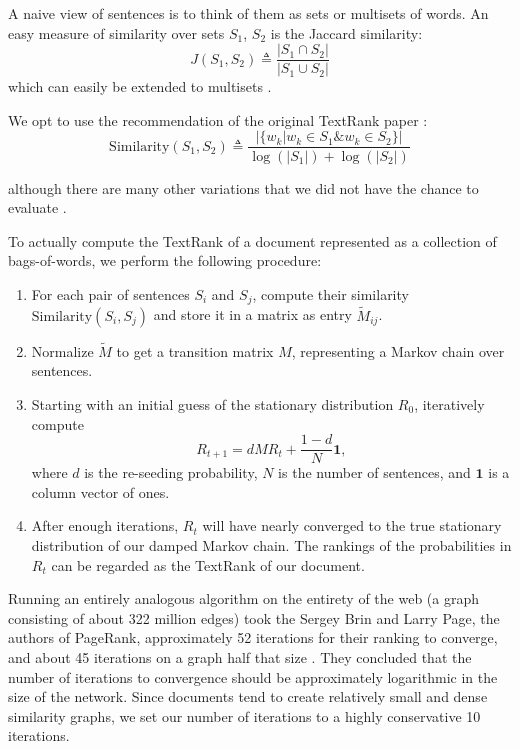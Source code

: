 A naive view of sentences is to think of them as sets or multisets of words.
An easy measure of similarity over sets $S_1$, $S_2$ is the Jaccard similarity:
\begin{equation*}
  J(S_1, S_2) \triangleq \frac{|S_1 \cap S_2|}{|S_1 \cup S_2|}
\end{equation*}
which can easily be extended to multisets \cite{wiki:Multiset}.

We opt to use the recommendation of the original TextRank paper \cite{textrank}:
\begin{equation*}
  \text{Similarity}(S_1, S_2) \triangleq \frac{ | \{ w_k | w_k \in S_1 \& w_k \in S_2 \} |}{\log(|S_1|) + \log(|S_2|)}
\end{equation*}

although there are many other variations that we did not have the chance to evaluate \cite{textrank-sim-var}.

To actually compute the TextRank of a document represented as a collection of bags-of-words, we perform the following procedure:
\begin{enumerate}
\item For each pair of sentences $S_i$ and $S_j$, compute their similarity $\text{Similarity}(S_i, S_j)$ and store it in a matrix as entry $\tilde{M}_{ij}$.
\item Normalize $\tilde{M}$ to get a transition matrix $M$, representing a Markov chain over sentences.
\item Starting with an initial guess of the stationary distribution $R_0$, iteratively compute 
  \[
    R_{t+1} = dMR_t + \frac{1-d}{N} \mathbf{1},
  \]
where $d$ is the re-seeding probability, $N$ is the number of sentences, and $\mathbf{1}$ is a column vector of ones.
\item After enough iterations, $R_t$ will have nearly converged to the true stationary distribution of our damped Markov chain. The rankings of the probabilities in $R_t$ can be regarded as the TextRank of our document.
\end{enumerate}

Running an entirely analogous algorithm on the entirety of the web (a graph consisting of about 322 million edges) took the Sergey Brin and Larry Page, the authors of PageRank, approximately 52 iterations for their ranking to converge, and about 45 iterations on a graph half that size \cite{wiki:PageRank}. 
They concluded that the number of iterations to convergence should be approximately logarithmic in the size of the network.
Since documents tend to create relatively small and dense similarity graphs, we set our number of iterations to a highly conservative 10 iterations.
